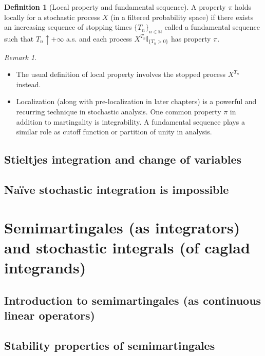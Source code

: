 \documentclass[openany,oneside]{book}
\theoremstyle{definition}
\newtheorem{defn}[thm]{Definition}
\theoremstyle{remark}
\newtheorem{rem}[thm]{Remark}
\newcommand{\I}{\mathbb{I}} %
\begin{document}
\begin{defn}[Local property and fundamental sequence]
A property $\pi$ holds locally for a stochastic process $X$ (in a filtered probability space) if there exists an increasing sequence of stopping times $\{T_n\}_{n\in\mathbb{N}}$ called a fundamental sequence such that $T_n \uparrow +\infty$ a.s. and each process $X^{T_n} \I_{\{T_n >0\}}$ has property $\pi$. 
\end{defn}

\begin{rem}\
\begin{itemize}
\item The usual definition of local property involves the stopped process $X^{T_n}$ instead.
\item Localization (along with pre-localization in later chapters) is a powerful and recurring technique in stochastic analysis. One common property $\pi$ in addition to martingality is integrability. A fundamental sequence plays a similar role as cutoff function or partition of unity in analysis.
\end{itemize}
\end{rem}

\section{Stieltjes integration and change of variables}

\section{Na\"ive stochastic integration is impossible}



\chapter{Semimartingales (as integrators) and stochastic integrals (of caglad integrands)}

\section{Introduction to semimartingales (as continuous linear operators)}

\section{Stability properties of semimartingales}
\end{document}
